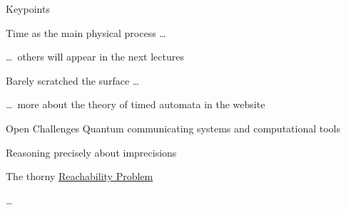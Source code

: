 \documentclass{beamer}
\begin{document}
\begin{frame}{Keypoints}


        \vspace{0.4cm}
        \alert{Time} as the main physical process \dots

        \dots\ others will appear in the next lectures

        \vspace{0.4cm}
        Barely scratched the surface \dots

        \dots\ more about the theory of timed automata 
        in the website
\end{frame}
\begin{frame}{Open Challenges}
        \alert{Quantum} communicating systems 
        and computational tools

        Reasoning precisely about imprecisions

        The thorny \href{https://www.youtube.com/watch?v=IzSs\_gJDVzI}{\alert{Reachability Problem}}

        \dots
\end{frame}
\end{document}
